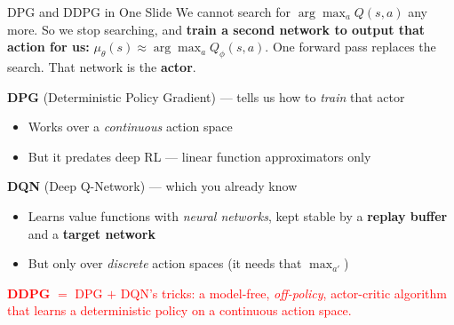 
\begin{frame}{DPG and DDPG in One Slide}
\vspace{0.3em}
We cannot search for $\arg\max_a Q(s,a)$ any more. So we stop searching, and
\textbf{train a second network to output that action for us:} $\mu_\theta(s) \approx \arg\max_a Q_\phi(s,a)$. One forward pass replaces the search. That network is the \textbf{actor}.
\vspace{0.7em}
\pause

\textbf{DPG} (Deterministic Policy Gradient)  --- tells us how to \emph{train} that actor
\begin{itemize}
    \item[--] Works over a \emph{continuous} action space
    \item[--] But it predates deep RL --- linear function approximators only
\end{itemize}
\pause
\vspace{0.6em}
\textbf{DQN} (Deep Q-Network)  --- which you already know
\begin{itemize}
    \item[--] Learns value functions with \emph{neural networks}, kept stable by a \textbf{replay buffer} and a \textbf{target network}
    \item[--] But only over \emph{discrete} action spaces (it needs that $\max_{a'}$)
\end{itemize}
\pause
\vspace{0.7em}
\begin{center}
\textcolor{red}{\textbf{DDPG}  $=$ DPG $+$ DQN's tricks: a model-free, \emph{off-policy}, actor-critic algorithm\\ that learns a deterministic policy on a continuous action space.}
\end{center}
\end{frame}
